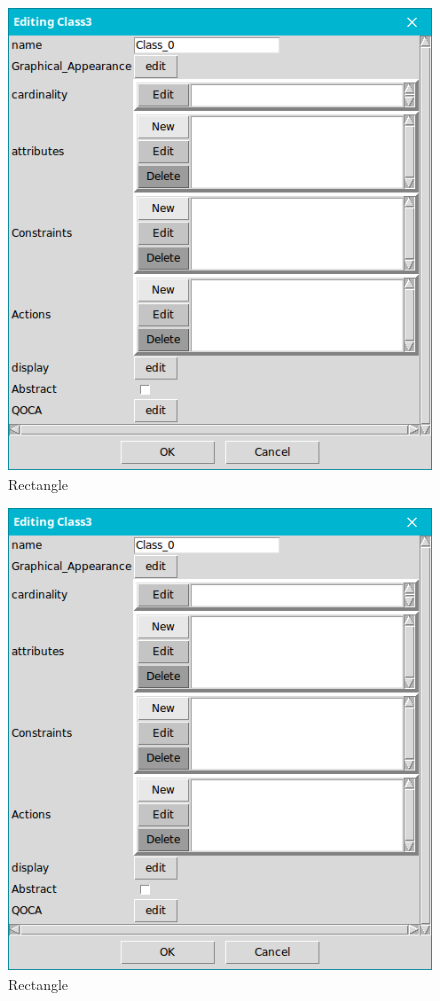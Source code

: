  


 

\begin{minipage}{0.5\textwidth}
	\begin{figure}[H]
	\includegraphics[scale=0.4]{ch3/img/class}
	\caption{\label{fig:blue_rectangle} Rectangle}
	\end{figure}\end{minipage} \hfill
\begin{minipage}{0.45\textwidth}
	\begin{figure}[H]
	\includegraphics[scale=0.4]{ch3/img/class}
	\caption{\label{fig:blue_rectangle} Rectangle}
	\end{figure}
\end{minipage}

